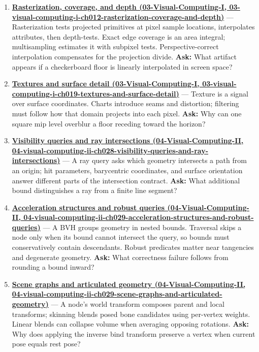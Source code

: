 \begin{enumerate}
\item
  \textbf{\href{../03-Visual-Computing-I/main.pdf\#nameddest=03-visual-computing-i-ch012-rasterization-coverage-and-depth}{Rasterization, coverage, and depth (03-Visual-Computing-I, 03-visual-computing-i-ch012-rasterization-coverage-and-depth)}} --- Rasterization tests projected primitives at pixel sample locations, interpolates attributes, then depth-tests. Exact edge coverage is an area integral; multisampling estimates it with subpixel tests. Perspective-correct interpolation compensates for the projection divide. \textbf{Ask:} What artifact appears if a checkerboard floor is linearly interpolated in screen space?
\item
  \textbf{\href{../03-Visual-Computing-I/main.pdf\#nameddest=03-visual-computing-i-ch019-textures-and-surface-detail}{Textures and surface detail (03-Visual-Computing-I, 03-visual-computing-i-ch019-textures-and-surface-detail)}} --- Texture is a signal over surface coordinates. Charts introduce seams and distortion; filtering must follow how that domain projects into each pixel. \textbf{Ask:} Why can one square mip level overblur a floor receding toward the horizon?
\item
  \textbf{\href{../04-Visual-Computing-II/main.pdf\#nameddest=04-visual-computing-ii-ch028-visibility-queries-and-ray-intersections}{Visibility queries and ray intersections (04-Visual-Computing-II, 04-visual-computing-ii-ch028-visibility-queries-and-ray-intersections)}} --- A ray query asks which geometry intersects a path from an origin; hit parameters, barycentric coordinates, and surface orientation answer different parts of the intersection contract. \textbf{Ask:} What additional bound distinguishes a ray from a finite line segment?
\item
  \textbf{\href{../04-Visual-Computing-II/main.pdf\#nameddest=04-visual-computing-ii-ch029-acceleration-structures-and-robust-queries}{Acceleration structures and robust queries (04-Visual-Computing-II, 04-visual-computing-ii-ch029-acceleration-structures-and-robust-queries)}} --- A BVH groups geometry in nested bounds. Traversal skips a node only when its bound cannot intersect the query, so bounds must conservatively contain descendants. Robust predicates matter near tangencies and degenerate geometry. \textbf{Ask:} What correctness failure follows from rounding a bound inward?
\item
  \textbf{\href{../04-Visual-Computing-II/main.pdf\#nameddest=04-visual-computing-ii-ch029-scene-graphs-and-articulated-geometry}{Scene graphs and articulated geometry (04-Visual-Computing-II, 04-visual-computing-ii-ch029-scene-graphs-and-articulated-geometry)}} --- A node's world transform composes parent and local transforms; skinning blends posed bone candidates using per-vertex weights. Linear blends can collapse volume when averaging opposing rotations. \textbf{Ask:} Why does applying the inverse bind transform preserve a vertex when current pose equals rest pose?

\end{enumerate}
